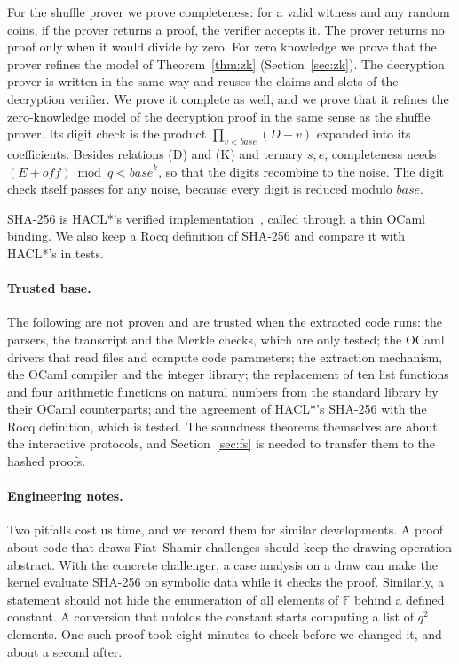 \documentclass[sigconf,anonymous]{acmart}
\newcommand{\F}{\mathbb{F}}
\begin{document}
For the shuffle prover we prove completeness: for a valid witness and any random coins, if the prover
returns a proof, the verifier accepts it. The prover returns no proof only when it would divide by
zero. For zero knowledge we prove that the prover refines the model of Theorem~\ref{thm:zk}
(Section~\ref{sec:zk}). The decryption prover is written in the same way and reuses the claims and
slots of the decryption verifier. We prove it complete as well, and we prove that it refines the
zero-knowledge model of the decryption proof in the same sense as the shuffle prover. Its digit check
is the product $\prod_{v<\mathit{base}}(D-v)$ expanded into its coefficients. Besides relations (D)
and (K) and ternary $s,e$, completeness needs $(E+\mathit{off}) \bmod q < \mathit{base}^{k}$, so that
the digits recombine to the noise. The digit check itself passes for any noise, because every digit
is reduced modulo $\mathit{base}$.

SHA-256 is HACL*'s verified implementation~\cite{HACL17}, called through a thin OCaml binding. We also
keep a Rocq definition of SHA-256 and compare it with HACL*'s in tests.

\paragraph{Trusted base.}
The following are not proven and are trusted when the extracted code runs: the parsers, the
transcript and the Merkle checks, which are only tested; the OCaml drivers that read files and
compute code parameters; the extraction mechanism, the OCaml compiler and the integer library; the
replacement of ten list functions and four arithmetic functions on natural numbers from the standard
library by their OCaml counterparts; and the agreement of HACL*'s SHA-256 with the Rocq definition,
which is tested. The soundness theorems themselves are about the interactive protocols, and
Section~\ref{sec:fs} is needed to transfer them to the hashed proofs.

\paragraph{Engineering notes.}
Two pitfalls cost us time, and we record them for similar developments. A proof about code that
draws Fiat--Shamir challenges should keep the drawing operation abstract. With the concrete
challenger, a case analysis on a draw can make the kernel evaluate SHA-256 on symbolic data while it
checks the proof. Similarly, a statement should not hide the enumeration of all elements of $\F$
behind a defined constant. A conversion that unfolds the constant starts computing a list of $q^2$
elements. One such proof took eight minutes to check before we changed it, and about a second after.
\end{document}
